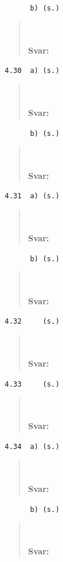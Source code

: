 \documentclass[a4paper]{article}
\newcommand{\tskcol}[1]{\textcolor{tskcol}{#1}}
\begin{document}
\texttt{\tskcol{~~~~~~b) (s.)}}
\begin{quotation}
	\noindent
	\\ \\
	\textbf{Svar:}
\end{quotation}

\texttt{\tskcol{4.30~~a) (s.)}}
\begin{quotation}
	\noindent
	\\ \\
	\textbf{Svar:}
\end{quotation}

\texttt{\tskcol{~~~~~~b) (s.)}}
\begin{quotation}
	\noindent
	\\ \\
	\textbf{Svar:}
\end{quotation}

\texttt{\tskcol{4.31~~a) (s.)}}
\begin{quotation}
	\noindent
	\\ \\
	\textbf{Svar:}
\end{quotation}

\texttt{\tskcol{~~~~~~b) (s.)}}
\begin{quotation}
	\noindent
	\\ \\
	\textbf{Svar:}
\end{quotation}

\texttt{\tskcol{4.32~~~~ (s.)}}
\begin{quotation}
	\noindent
	\\ \\
	\textbf{Svar:}
\end{quotation}

\texttt{\tskcol{4.33~~~~ (s.)}}
\begin{quotation}
	\noindent
	\\ \\
	\textbf{Svar:}
\end{quotation}

\texttt{\tskcol{4.34~~a) (s.)}}
\begin{quotation}
	\noindent
	\\ \\
	\textbf{Svar:}
\end{quotation}

\texttt{\tskcol{~~~~~~b) (s.)}}
\begin{quotation}
	\noindent
	\\ \\
	\textbf{Svar:}
\end{quotation}
\end{document}
